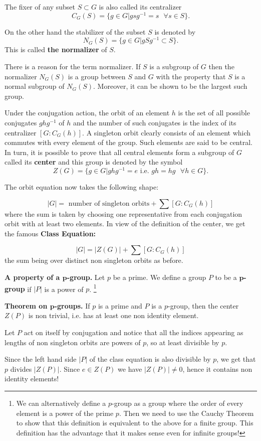\documentclass[12pt]{article}
\begin{document}
\begin{description}
The fixer of any subset $S\subset G$ is also called its centralizer  
$$C_G(S) = \{ g\in G | gsg^{-1}=s \ \ \ \forall s\in S\}.$$

On the other hand the stabilizer of the subset $S$ is denoted by
$$N_G(S) = \{ g\in G | gSg^{-1}\subset S\}.$$
This is called {\bf the normalizer} of $S$.

There is a reason for the term normalizer. If $S$ is a subgroup of $G$
then the normalizer $N_G(S)$ is a group between $S$ and $G$ with the
property that $S$ is a normal subgroup of $N_G(S)$. Moreover, it can be
shown to be the largest such group.

Under the conjugation action, the orbit of an element $h$ is the set of
all possible conjugates $ghg^{-1}$  of $h$ and the number of such
conjugates is the index of its centralizer $[G:C_G(h)]$. A singleton
orbit clearly consists of an element which commutes with every element
of the group. Such elements are said to be central. 
In turn, it is possible to prove that all central elements form a subgroup of $G$ 
called its {\bf center} and this group is denoted by the symbol
$$Z(G) = \{ g\in G | ghg^{-1}=e \mbox{ i.e. } gh=hg \ \ \ \forall h\in
G\}.$$

The orbit equation now takes the following shape:

$$|G| = \mbox{ number of singleton orbits} + \sum [G:C_G(h)]$$
where the sum is taken by choosing one representative from each
conjugation orbit with at least two elements. In view of the definition
of the center, we get the famous {\bf Class
Equation:}

$$|G| = |Z(G)| + \sum [G:C_G(h)]$$
the sum being over distinct non singleton orbits as before.

\item {\bf A property of a $\mathbf{p}$-group.}
Let $p$ be a prime.
We define a group $P$ to be a {\bf $\mathbf{p}$-group} if $|P|$ 
is a power of $p$.
\footnote{We can alternatively define a $p$-group as a group where the
order of every element is a power of the prime $p$. Then we need to use
the Cauchy Theorem to show that this definition is equivalent to the
above for a finite group. This definition has the advantage that it
makes sense even for infinite groups!}

{\bf Theorem on $\mathbf{p}$-groups.}
If $p$ is a prime and $P$ is a $p$-group, then the center $Z(P)$ is non
trivial, i.e. has at least one non identity element.

Let $P$ act on itself by conjugation and notice that all the indices
appearing as lengths of non singleton orbits are powers of $p$, so at
least divisible by $p$.

Since the left hand side $|P|$ of the class equation is also divisible by $p$,
we get that $p$ divides $|Z(P)|$. Since $e\in Z(P)$ we have $|Z(P)|\neq
0$, hence it contains non identity elements!


\end{description}
\end{document}
